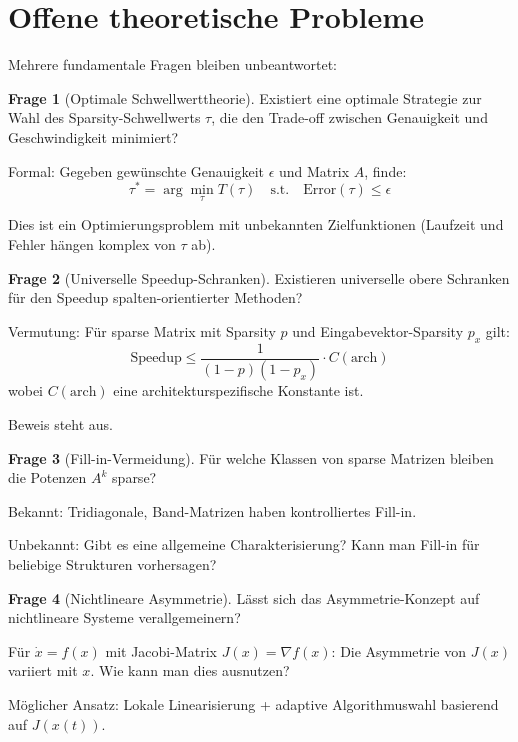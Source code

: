 \documentclass[a4paper,12pt]{report}
\theoremstyle{definition}
\newtheorem{frage}{Frage}
\begin{document}
	\section{Offene theoretische Probleme}
	
	Mehrere fundamentale Fragen bleiben unbeantwortet:
	
	\begin{frage}[Optimale Schwellwerttheorie]
		Existiert eine optimale Strategie zur Wahl des Sparsity-Schwellwerts $\tau$, die den Trade-off zwischen Genauigkeit und Geschwindigkeit minimiert?
		
		Formal: Gegeben gewünschte Genauigkeit $\epsilon$ und Matrix $A$, finde:
		\[
		\tau^* = \arg\min_{\tau} T(\tau) \quad \text{s.t.} \quad \text{Error}(\tau) \leq \epsilon
		\]
		
		Dies ist ein Optimierungsproblem mit unbekannten Zielfunktionen (Laufzeit und Fehler hängen komplex von $\tau$ ab).
	\end{frage}
	
	\begin{frage}[Universelle Speedup-Schranken]
		Existieren universelle obere Schranken für den Speedup spalten-orientierter Methoden?
		
		Vermutung: Für sparse Matrix mit Sparsity $p$ und Eingabevektor-Sparsity $p_x$ gilt:
		\[
		\text{Speedup} \leq \frac{1}{(1-p)(1-p_x)} \cdot C(\text{arch})
		\]
		wobei $C(\text{arch})$ eine architekturspezifische Konstante ist.
		
		Beweis steht aus.
	\end{frage}
	
	\begin{frage}[Fill-in-Vermeidung]
		Für welche Klassen von sparse Matrizen bleiben die Potenzen $A^k$ sparse?
		
		Bekannt: Tridiagonale, Band-Matrizen haben kontrolliertes Fill-in.
		
		Unbekannt: Gibt es eine allgemeine Charakterisierung? Kann man Fill-in für beliebige Strukturen vorhersagen?
	\end{frage}
	
	\begin{frage}[Nichtlineare Asymmetrie]
		Lässt sich das Asymmetrie-Konzept auf nichtlineare Systeme verallgemeinern?
		
		Für $\dot{x} = f(x)$ mit Jacobi-Matrix $J(x) = \nabla f(x)$: Die Asymmetrie von $J(x)$ variiert mit $x$. Wie kann man dies ausnutzen?
		
		Möglicher Ansatz: Lokale Linearisierung + adaptive Algorithmuswahl basierend auf $J(x(t))$.
	\end{frage}
\end{document}
